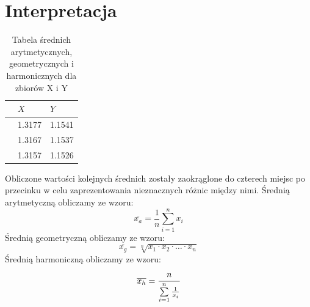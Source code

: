 \documentclass[12pt]{mwart}
\begin{document}
	\section{Interpretacja}
	\begin{table}[H]
		\centering
		\begin{tabular}{|l|l|l|} 
			\hline
			\text{Średnia} & $X$&$Y$ \\ \hline
			\text{Arytmetyczna} & 1.3177 & 1.1541 \\ \hline
			\text{Geometryczna} & 1.3167 & 1.1537 \\ \hline
			\text{Harmoniczna} & 1.3157  &1.1526 \\ \hline
		\end{tabular}
	\caption{Tabela średnich arytmetycznych, geometrycznych i harmonicznych dla zbiorów X i Y}
	\end{table}
\noindent Obliczone wartości kolejnych średnich zostały zaokrąglone do czterech miejsc po przecinku w celu zaprezentowania nieznacznych różnic między nimi. Średnią arytmetyczną obliczamy ze wzoru:
\begin{equation}
	\overline{x_a} = \frac{1}{n}\sum\limits_{i=1}^{n} x_i
\end{equation}
Średnią geometryczną obliczamy ze wzoru:
\begin{equation}
\overline{x_g}=\sqrt[n]{x_1\cdot x_2\cdot \ldots \cdot x_n}
\end{equation}
Średnią harmoniczną obliczamy ze wzoru:
\begin{equation}
	\overline{x_h} = \cfrac{n}{\sum\limits_{i=1}^{n} \frac{1}{x_i}}
\end{equation}
\end{document}
